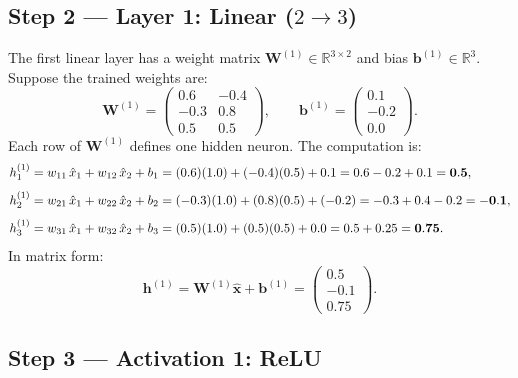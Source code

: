 \documentclass[11pt,a4paper]{article}
\newcommand{\R}{\mathbb{R}}
\newcommand{\bx}{\mathbf{x}}
\newcommand{\bW}{\mathbf{W}}
\newcommand{\bb}{\mathbf{b}}
\newcommand{\bh}{\mathbf{h}}
\begin{document}
\subsection{Step 2 --- Layer 1: Linear ($2 \to 3$)}

The first linear layer has a weight matrix
$\bW^{(1)} \in \R^{3 \times 2}$ and bias $\bb^{(1)} \in \R^3$.
Suppose the trained weights are:
\[
  \bW^{(1)} =
  \begin{pmatrix}
     0.6 & -0.4 \\
    -0.3 &  0.8 \\
     0.5 &  0.5
  \end{pmatrix},
  \qquad
  \bb^{(1)} =
  \begin{pmatrix} 0.1 \\ -0.2 \\ 0.0 \end{pmatrix}.
\]
Each row of $\bW^{(1)}$ defines one hidden neuron.  The computation is:
\begin{align}
  h^{(1)}_1 &= w_{11}\,\hat{x}_1 + w_{12}\,\hat{x}_2 + b_1
             = (0.6)(1.0) + (-0.4)(0.5) + 0.1
             = 0.6 - 0.2 + 0.1
             = \mathbf{0.5}, \notag \\[4pt]
  h^{(1)}_2 &= w_{21}\,\hat{x}_1 + w_{22}\,\hat{x}_2 + b_2
             = (-0.3)(1.0) + (0.8)(0.5) + (-0.2)
             = -0.3 + 0.4 - 0.2
             = \mathbf{-0.1}, \notag \\[4pt]
  h^{(1)}_3 &= w_{31}\,\hat{x}_1 + w_{32}\,\hat{x}_2 + b_3
             = (0.5)(1.0) + (0.5)(0.5) + 0.0
             = 0.5 + 0.25
             = \mathbf{0.75}. \notag
\end{align}
In matrix form:
\[
  \bh^{(1)} = \bW^{(1)}\hat{\bx} + \bb^{(1)}
  = \begin{pmatrix} 0.5 \\ -0.1 \\ 0.75 \end{pmatrix}.
\]

\subsection{Step 3 --- Activation 1: ReLU}
\end{document}
